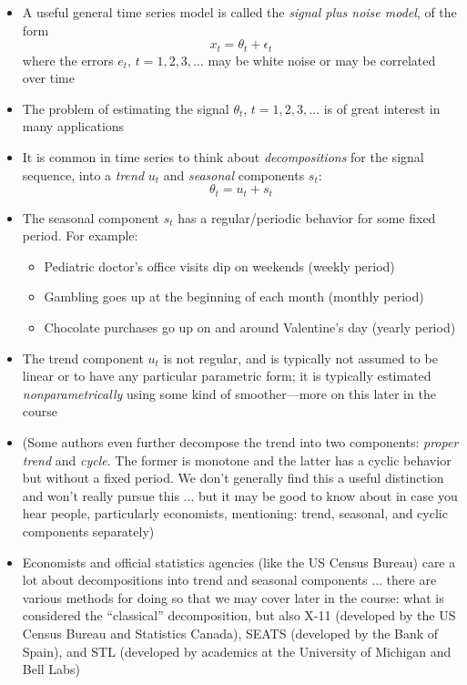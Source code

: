 \documentclass{article}
\begin{document}
\begin{itemize}
\item A useful general time series model is called the \emph{signal plus noise
    model}, of the form 
  \[
  x_t = \theta_t + \epsilon_t
  \]
  where the errors $e_t$, $t = 1,2,3,\dots$ may be white noise or may be
  correlated over time

\item The problem of estimating the signal $\theta_t$, $t = 1,2,3,\dots$ is of
  great interest in many applications 

\item It is common in time series to think about \emph{decompositions} for the
  signal sequence, into a \emph{trend} $u_t$ and \emph{seasonal} components
  $s_t$: 
  \[
  \theta_t = u_t + s_t 
  \]

\item The seasonal component $s_t$ has a regular/periodic behavior for some
  fixed period. For example: 

\begin{itemize}
\item Pediatric doctor's office visits dip on weekends (weekly period)
\item Gambling goes up at the beginning of each month (monthly period)
\item Chocolate purchases go up on and around Valentine's day (yearly period)
\end{itemize}

\item The trend component $u_t$ is not regular, and is typically not assumed to
  be linear or to have any particular parametric form; it is typically estimated  
  \emph{nonparametrically} using some kind of smoother---more on this later in 
  the course     

\item (Some authors even further decompose the trend into two components: 
  \emph{proper trend} and \emph{cycle}. The former is monotone and the latter
  has a cyclic behavior but without a fixed period. We don't generally find this
  a useful distinction and won't really pursue this ... but it may be good to
  know about in case you hear people, particularly economists, mentioning:
  trend, seasonal, and cyclic components separately)  

\item Economists and official statistics agencies (like the US Census Bureau) 
  care a lot about decompositions into trend and seasonal components ... there
  are various methods for doing so that we may cover later in the course: what
  is considered the ``classical'' decomposition, but also X-11 (developed by the
  US Census Bureau and Statistics Canada), SEATS (developed by the Bank of
  Spain), and STL (developed by academics at the University of Michigan and Bell 
  Labs)


\end{itemize}
\end{document}
